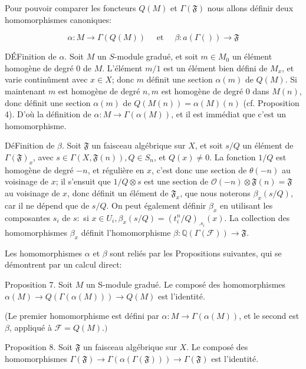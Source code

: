 Pour pouvoir comparer les foncteurs $Q(M)$ et $\Gamma(\mathfrak{F})$ nous allons définir deux homomorphismes canoniques:

$$
\alpha: M \rightarrow \Gamma(Q(M)) \quad \text { et } \quad \beta: a(\Gamma(\mathfrak{})) \rightarrow \mathfrak{F}
$$

DÉFinition de $\alpha .$ Soit $M$ un $S$-module gradué, et soit $m \in M_{0}$ un élément homogène de degré 0 de $M$. L'élément $m / 1$ est un élément bien défini de $M_{x}$, et varie continûment avec $x \in X$; donc $m$ définit une section $\alpha(m)$ de $Q(M)$. Si maintenant $m$ est homogène de degré $n, m$ est homogène de degré 0 dans $M(n)$, donc définit une section $\alpha(m)$ de $Q(M(n))=\alpha(M)(n)$ (cf. Proposition 4). D'où la définition de $\alpha: M \rightarrow \Gamma(\alpha(M))$, et il est immédiat que c'est un homomorphisme.

DéFinition de $\beta$. Soit $\mathfrak{F}$ un faisceau algébrique sur $X$, et soit $s / Q$ un élément de $\Gamma(\mathfrak{F})_{x}$, avec $s \in \Gamma(X, \mathfrak{F}(n)), Q \in S_{n}$, et $Q(x) \neq 0 .$ La fonction $1 / Q$ est homogène de degré $-n$, et régulière en $x$, c'est donc une section de $\theta(-n)$ au voisinage de $x$; il s'ensuit que $1 / Q \otimes s$ est une section de $\mathcal{O}(-n) \otimes \mathfrak{F}(n)=\mathfrak{F}$ au voisinage de $x$, donc définit un élément de $\mathfrak{F}_{x}$, que nous noterons $\beta_{x}(s / Q)$, car il ne dépend que de $s / Q$. On peut également définir $\beta_{x}$ en utilisant les composantes $s_{i}$ de $s:$ si $x \in U_{i}, \beta_{x}(s / Q)=\left(t_{i}^{n} / Q\right)_{. s_{i}}(x)$. La collection des homomorphismes $\beta_{x}$ définit l'homomorphisme $\beta: \mathbb{Q}(\Gamma(\mathcal{F})) \rightarrow \mathfrak{F} .$

Les homomorphismes $\alpha$ et $\beta$ sont reliés par les Propositions suivantes, qui se démontrent par un calcul direct:

Proposition 7. Soit $M$ un S-module gradué. Le composé des homomorphismes $\alpha(M) \rightarrow Q(\Gamma(\alpha(M))) \rightarrow Q(M)$ est l'identité.

(Le premier homomorphisme est défini par $\alpha: M \rightarrow \Gamma(\alpha(M))$, et le second est $\beta$, appliqué à $\mathscr{F}=Q(M) .)$

Proposition 8. Soit $\mathfrak{F}$ un faisceau algébrique sur $X$. Le composé des homomorphismes $\Gamma(\mathfrak{F}) \rightarrow \Gamma(\alpha(\Gamma(\mathfrak{F}))) \rightarrow \Gamma(\mathfrak{F})$ est l'identité.

